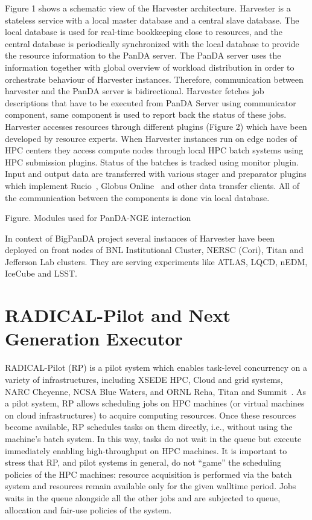 \documentclass{webofc}
\begin{document}
Figure 1 shows a schematic view of the Harvester architecture. Harvester is a
stateless service with a local master database and a central slave database.
The local database is used for real-time bookkeeping close to resources, and
the central database is periodically synchronized with the local database to
provide the resource information to the PanDA server. The PanDA server uses
the information together with global overview of workload distribution in
order to orchestrate behaviour of Harvester instances. Therefore,
communication between harvester and the PanDA server is bidirectional.
Harvester fetches job descriptions that have to be executed from PanDA Server
using communicator component, same component is used to report back the
status of these jobs. Harvester accesses resources through different plugins
(Figure 2) which have been developed by resource experts. When Harvester
instances run on edge nodes of HPC centers they access compute nodes through
local HPC batch systems using HPC submission plugins. Status of the batches
is tracked using monitor plugin. Input and output data are transferred with
various stager and preparator plugins which implement
Rucio~\cite{garonne2014rucio}, Globus Online~\cite{foster2011globus}  and
other data transfer clients. All of the communication between the components
is done via local database.


Figure. Modules used for PanDA-NGE interaction

In context of BigPanDA project several instances of Harvester have been
deployed on front nodes of BNL Institutional Cluster, NERSC (Cori), Titan and
Jefferson Lab clusters. They are serving experiments like ATLAS, LQCD, nEDM,
IceCube and LSST.


\section{RADICAL-Pilot and Next Generation Executor}\label{sec:rp}

RADICAL-Pilot (RP) is a pilot system which enables task-level concurrency on
a variety of infrastructures, including XSEDE HPC, Cloud and grid systems,
NARC Cheyenne, NCSA Blue Waters, and ORNL Reha, Titan and
Summit~\cite{merzky2018using}. As a pilot system, RP allows scheduling jobs
on HPC machines (or virtual machines on cloud infrastructures) to acquire
computing resources. Once these resources become available, RP schedules
tasks on them directly, i.e., without using the machine’s batch system. In
this way, tasks do not wait in the queue but execute immediately enabling
high-throughput on HPC machines. It is important to stress that RP, and pilot
systems in general, do not “game” the scheduling policies of the HPC
machines: resource acquisition is performed via the batch system and
resources remain available only for the given walltime period. Jobs waits in
the queue alongside all the other jobs and are subjected to queue, allocation
and fair-use policies of the system.
	
\end{document}
